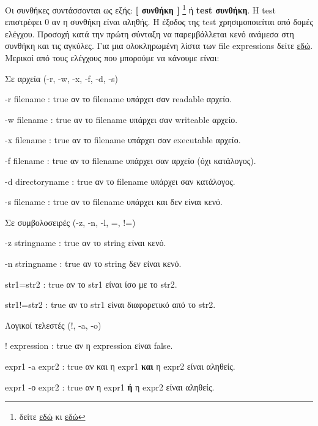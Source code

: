 Οι συνθήκες συντάσσονται ως εξής: \textbf{[ συνθήκη ]} \footnote{δείτε \href{http://steve-parker.org/sh/test.shtml}{εδώ} κι \href{http://tldp.org/LDP/Bash-Beginners-Guide/html/sect_07_01.html}{εδώ}} ή \textbf{test συνθήκη}. Η test  επιστρέφει 0 αν η συνθήκη είναι αληθής. Η έξοδος της
test χρησιμοποιείται από δομές ελέγχου. Προσοχή κατά την πρώτη σύνταξη να παρεμβάλλεται κενό ανάμεσα στη συνθήκη και τις αγκύλες. 
Για μια ολοκληρωμένη λίστα των file expressions δείτε \href{http://www.gnu.org/software/bash/manual/html_node/Bash-Conditional-Expressions.html}{εδώ}.
Μερικοί από τους ελέγχους που μπορούμε να κάνουμε είναι:
\begin{packed_item}
	\item Σε αρχεία (-r, -w, -x, -f, -d, -s)
	\begin{packed_item}
		\item -r filename : true αν το filename υπάρχει σαν readable αρχείο.
		\item -w filename : true αν το filename υπάρχει σαν writeable αρχείο.
		\item -x filename : true αν το filename υπάρχει σαν executable αρχείο.
		\item -f filename : true αν το filename υπάρχει σαν αρχείο (όχι κατάλογος).
		\item -d directoryname : true αν το filename υπάρχει σαν κατάλογος.
		\item -s filename : true αν το filename υπάρχει και δεν είναι κενό.
	\end{packed_item}
	\item Σε συμβολοσειρές (-z, -n, -l, =, !=)
	\begin{packed_item}
		\item -z stringname : true αν το string είναι κενό.
		\item -n stringname : true αν το string δεν είναι κενό.
		\item str1=str2 : true αν το str1 είναι ίσο με το str2.
		\item str1!=str2  : true αν το str1 είναι διαφορετικό από το str2.
	\end{packed_item}
	\item Λογικοί τελεστές (!, -a, -o)
	\begin{packed_item}
		\item ! expression : true αν η expression είναι false.
		\item expr1 -a expr2 : true αν και η expr1 \textbf{και} η expr2 είναι αληθείς.
		\item expr1 -ο expr2 : true αν η expr1 \textbf{ή} η expr2 είναι αληθείς.

\end{packed_item}
\end{packed_item}
